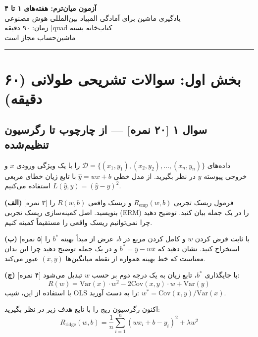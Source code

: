 \documentclass[12pt,a4paper]{article}
\begin{document}
\begin{center}
{\Large\bfseries آزمون میان‌ترم: هفته‌های ۱ تا ۴}\\[4pt]
{\large یادگیری ماشین برای آمادگی المپیاد بین‌المللی هوش مصنوعی}\\[4pt]
زمان: ۹۰ دقیقه \quad|‌‌quad کتاب‌خانه بسته\\[2pt]
ماشین‌حساب مجاز است
\end{center}

\rule{\textwidth}{0.5pt}

\tableofcontents

\bigskip

\section*{بخش اول: سوالات تشریحی طولانی (۶۰ دقیقه)}

\subsection*{سوال ۱ [۲۰ نمره] — از چارچوب تا رگرسیون تنظیم‌شده}

داده‌های $\mathcal{D} = \{(x_1, y_1), (x_2, y_2), \ldots, (x_n, y_n)\}$ را با یک ویژگی ورودی $x$ و خروجی پیوسته $y$ در نظر بگیرید. از مدل خطی $\hat{y} = wx + b$ با تابع زیان خطای مربعی $L(\hat{y}, y) = (\hat{y} - y)^2$ استفاده می‌کنیم.

\bigskip

\textbf{(الف)} [۳ نمره] فرمول ریسک تجربی $R_{\text{emp}}(w, b)$ و ریسک واقعی $R(w, b)$ را بنویسید. اصل کمینه‌سازی ریسک تجربی (ERM) را در یک جمله بیان کنید. توضیح دهید چرا نمی‌توانیم ریسک واقعی را مستقیماً کمینه کنیم.

\bigskip

\textbf{(ب)} [۵ نمره] با ثابت فرض کردن $w$ و کامل کردن مربع در $b$، عرض از مبدأ بهینه $b^*$ را استخراج کنید. نشان دهید که $b^* = \bar{y} - w\bar{x}$ و در یک جمله توضیح دهید چرا این بدان معناست که خط بهینه همواره از نقطه میانگین‌ها $(\bar{x}, \bar{y})$ عبور می‌کند.

\bigskip

\textbf{(ج)} [۴ نمره] با جایگذاری $b^*$، تابع زیان به یک درجه دوم بر حسب $w$ تبدیل می‌شود:
$$R(w) = \text{Var}(x) \cdot w^2 - 2\text{Cov}(x, y) \cdot w + \text{Var}(y)$$
با استفاده از این، شیب OLS را به دست آورید: $w^* = \text{Cov}(x, y)/\text{Var}(x)$.

\bigskip

اکنون رگرسیون ریج را با تابع هدف زیر در نظر بگیرید:
$$R_{\text{ridge}}(w, b) = \frac{1}{n}\sum_{i=1}^{n}(wx_i + b - y_i)^2 + \lambda w^2$$
\end{document}
